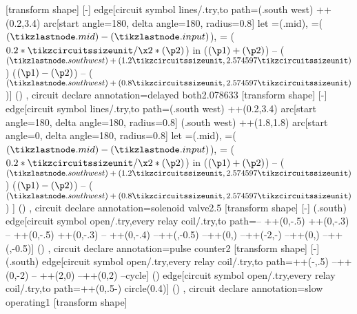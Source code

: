 {  {
    [transform shape]
    [-]
    edge[circuit symbol lines/.try,to path={(\tikzlastnode.south west) ++(0.2\tikzcircuitssizeunit,3.4\tikzcircuitssizeunit) arc[start angle=180, delta angle=180, radius=0.8\tikzcircuitssizeunit] let =(\tikzlastnode.mid), =($(\tikzlastnode.mid) - (\tikzlastnode.input)$),  = ($0.2*\tikzcircuitssizeunit/\x2*(\p2)$) in ($(\p1)+(\p2)$) -- ($(\tikzlastnode.south west) + (1.2\tikzcircuitssizeunit,2.574597\tikzcircuitssizeunit)$) ($(\p1)-(\p2)$) -- ($(\tikzlastnode.south west) + (0.8\tikzcircuitssizeunit,2.574597\tikzcircuitssizeunit)$)}] ()
  },
  circuit declare annotation={delayed both}{2.078633\tikzcircuitssizeunit}
  {
    [transform shape]
    [-]
    edge[circuit symbol lines/.try,to path={(\tikzlastnode.south west) ++(0.2\tikzcircuitssizeunit,3.4\tikzcircuitssizeunit) arc[start angle=180, delta angle=180, radius=0.8\tikzcircuitssizeunit] (\tikzlastnode.south west) ++(1.8\tikzcircuitssizeunit,1.8\tikzcircuitssizeunit) arc[start angle=0, delta angle=180, radius=0.8\tikzcircuitssizeunit] let =(\tikzlastnode.mid), =($(\tikzlastnode.mid) - (\tikzlastnode.input)$),  = ($0.2*\tikzcircuitssizeunit/\x2*(\p2)$) in ($(\p1)+(\p2)$) -- ($(\tikzlastnode.south west) + (1.2\tikzcircuitssizeunit,2.574597\tikzcircuitssizeunit)$) ($(\p1)-(\p2)$) -- ($(\tikzlastnode.south west) + (0.8\tikzcircuitssizeunit,2.574597\tikzcircuitssizeunit)$)} ] ()
  },
  circuit declare annotation={solenoid valve}{2.5\tikzcircuitssizeunit}
  {
    [transform shape]
    [-]
    (\tikzlastnode.south) edge[circuit symbol open/.try,every relay coil/.try,to path={-- ++(0,-.5\tikzcircuitssizeunit) ++(0,-.3\tikzcircuitssizeunit) -- ++(0,-.5\tikzcircuitssizeunit) ++(0,-.3\tikzcircuitssizeunit) -- ++(0,-.4\tikzcircuitssizeunit) --++(\tikzcircuitssizeunit,-0.5\tikzcircuitssizeunit)  --++(0,\tikzcircuitssizeunit) --++(-2\tikzcircuitssizeunit,-\tikzcircuitssizeunit)  --++(0,\tikzcircuitssizeunit) --++(\tikzcircuitssizeunit,-0.5\tikzcircuitssizeunit)}] ()
  },
  circuit declare annotation={pulse counter}{2\tikzcircuitssizeunit}
  {
    [transform shape]
    [-]
    (\tikzlastnode.south) edge[circuit symbol open/.try,every relay coil/.try,to path={++(-\tikzcircuitssizeunit,.5\pgflinewidth) --++(0,-2\tikzcircuitssizeunit) -- ++(2\tikzcircuitssizeunit,0) --++(0,2\tikzcircuitssizeunit) --cycle}] () edge[circuit symbol open/.try,every relay coil/.try,to path={++(0,.5\pgflinewidth-\tikzcircuitssizeunit)  circle(0.4\tikzcircuitssizeunit)}] ()
  },
  circuit declare annotation={slow operating}{1\tikzcircuitssizeunit}
  {
    [transform shape]
}}
